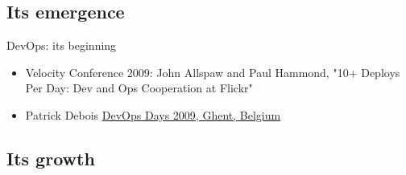 \documentclass{beamer}
\begin{document}
	\subsection{Its emergence}
	\begin{frame}{DevOps: its beginning}
		\begin{itemize}
			\item Velocity Conference 2009: John Allspaw and Paul Hammond, "10+ Deploys Per Day: Dev and Ops Cooperation at Flickr" \pause
			\item Patrick Debois \href{https://youtu.be/EOveXZhJpr4}{DevOps Days 2009, Ghent, Belgium}
		\end{itemize}
	\end{frame}
	\subsection{Its growth}
\end{document}
